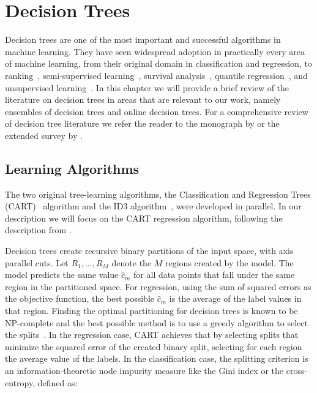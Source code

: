 \chapter{Decision Trees}
\label{ch:bg-decision-trees}

Decision trees are one of the most important and successful algorithms
in machine learning. They have seen widespread adoption in practically
every area of machine learning, from their original domain in classification
and regression, to ranking~\cite{lambdarank}, semi-supervised learning~\cite{semi-super-trees}, survival analysis~\cite{survival-forests},
quantile regression~\cite{meinshausen2006quantile}, and unsupervised learning~\cite{tree-clustering}. In this chapter
we will provide a brief review of the literature on decision trees in
areas that are relevant to our work, namely ensembles of decision
trees and online decision trees. For a comprehensive review of
decision tree literature we refer the reader to the monograph
by \citet{decision-trees-book} or the extended survey by \citet{tree-survey}.

\section{Learning Algorithms}
\label{sec:bg-dt-learning-algorithms}

The two original tree-learning algorithms, the
Classification and Regression Trees (CART)~\cite{breiman1984cart} algorithm and the ID3
algorithm~\cite{id3}, were developed in parallel. In our description we will
focus on the CART regression algorithm, following the description from \cite{esl}.

Decision trees create recursive binary partitions of the input space,
with axis parallel cuts. Let $R_1, ..., R_M$ denote the $M$ regions created by
the model.
The model predicts the same value $\hat{c}_m$ for all data points
that fall under the same region in the partitioned space. For regression,
using the sum of squared errors as the objective function, the best possible
$\hat{c}_m$ is the average of the label values in that region.
Finding the optimal partitioning for decision trees is known to be
NP-complete \cite{dt-np-complete} and the best possible method
is to use a greedy algorithm to select the splits~\cite{dt-hardness}.
In the regression case, CART achieves that by selecting splits
that minimize the squared error of the created binary split, selecting
for each region the average value of the labels.
In the classification case, the splitting criterion is an information-theoretic
node impurity measure like the Gini index or the cross-entropy, defined as:

